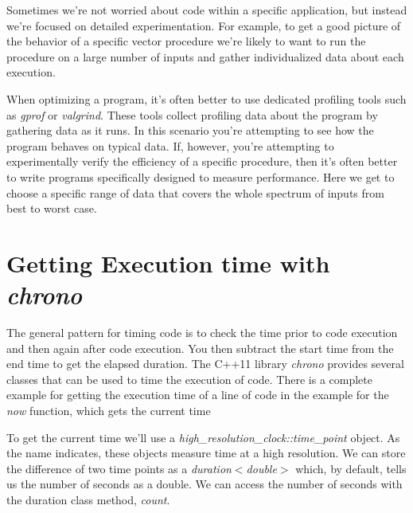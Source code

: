 \documentclass[]{tufte-handout}
\begin{document}
Sometimes we're not worried about code within a specific application, but instead we're focused on detailed experimentation. For example, to get a good picture of the behavior of a specific vector procedure we're likely to want to run the procedure on a large number of inputs and gather individualized data about each execution. 

When optimizing a program, it's often better to use dedicated profiling tools such as \textit{gprof} or \textit{valgrind}. These tools collect profiling data about the program by gathering data as it runs.  In this scenario you're attempting to see how the program behaves on typical data.  If, however, you're attempting to experimentally verify the efficiency of a specific procedure, then it's often better to write programs specifically designed to measure performance. Here we get to choose a specific range of data that covers the whole spectrum of inputs from best to worst case. 

\section{Getting Execution time with \textit{chrono}}

The general pattern for timing code is to check the time prior to code execution and then again after code execution. You then subtract the start time from the end time to get the elapsed duration. The C++11 library \textit{chrono} provides several classes that can be used to time the execution of code. There is a complete example for getting the execution time of a line of code in the example for the \textit{now} function, which gets the current time


To get the current time we'll use a \textit{high\_resolution\_clock::time\_point} object. As the name indicates, these objects measure time at a high resolution. We can store the difference of two time points as a \textit{duration$<$double$>$} which, by default, tells us the number of seconds as a double. We can access the number of seconds with the duration class method, \textit{count}. 
\end{document}
